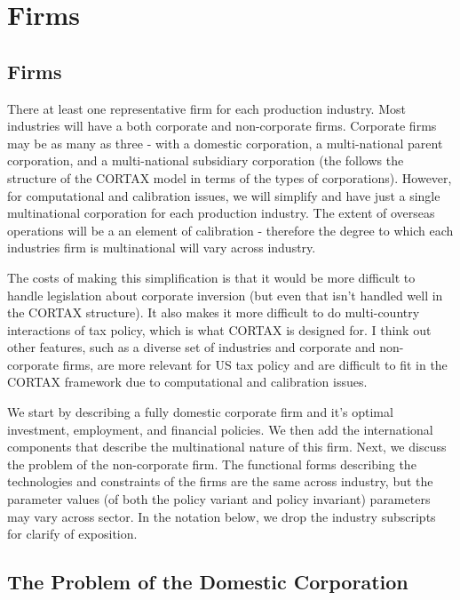 \chapter{Firms}
\label{chap:firms}
%



\section{Firms}

There at least one representative firm for each production industry.  Most industries will have a both corporate and non-corporate firms.  Corporate firms may be as many as three - with a domestic corporation, a multi-national parent corporation, and a multi-national subsidiary corporation (the follows the structure of the CORTAX model in terms of the types of corporations).  However, for computational and calibration issues, we will simplify and have just a single multinational corporation for each production industry.  The extent of overseas operations will be a an element of calibration - therefore the degree to which each industries firm is multinational will vary across industry.  

The costs of making this simplification is that it would be more difficult to handle legislation about corporate inversion (but even that isn't handled well in the CORTAX structure).  It also makes it more difficult to do multi-country interactions of tax policy, which is what CORTAX is designed for.  I think out other features, such as a diverse set of industries and corporate and non-corporate firms, are more relevant for US tax policy and are difficult to fit in the CORTAX framework due to computational and calibration issues.

We start by describing a fully domestic corporate firm and it's optimal investment, employment, and financial policies.  We then add the international components that describe the multinational nature of this firm.  Next, we discuss the problem of the non-corporate firm.   The functional forms describing the technologies and constraints of the firms are the same across industry, but the parameter values (of both the policy variant and policy invariant) parameters may vary across sector.  In the notation below, we drop the industry subscripts for clarify of exposition.

\section{The Problem of the Domestic Corporation}

